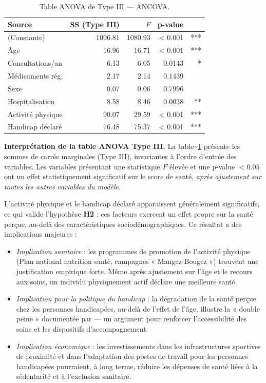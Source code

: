 \documentclass[11pt,a4paper]{memoirerecherche}
\providecommand{\tightlist}{%
  \setlength{\itemsep}{0pt}\setlength{\parskip}{0pt}}
\begin{document}
\begin{table}[!h]
\centering
\caption{\label{tab:tab-ancova}Table ANOVA de Type III --- ANCOVA.}
\centering
\fontsize{9}{11}\selectfont
\begin{tabular}[t]{lrrrr}
\toprule
Source & SS (Type III) & $F$ & p-value & \\
\midrule
(Constante) & 1096.81 & 1080.93 & < 0.001 & ***\\
Âge & 16.96 & 16.71 & < 0.001 & ***\\
Consultations/an & 6.13 & 6.05 & 0.0143 & *\\
Médicaments rég. & 2.17 & 2.14 & 0.1439 & \\
Sexe & 0.07 & 0.06 & 0.7996 & \\
\addlinespace
Hospitalisation & 8.58 & 8.46 & 0.0038 & **\\
Activité physique & 90.07 & 29.59 & < 0.001 & ***\\
Handicap déclaré & 76.48 & 75.37 & < 0.001 & ***\\
\bottomrule
\end{tabular}
\end{table}

\textbf{Interprétation de la table ANOVA Type III.} La table\textasciitilde\ref{tab:tab-ancova} présente les sommes de carrés marginales (Type III), invariantes à l'ordre d'entrée des variables. Les variables présentant une statistique \(F\) élevée et une p-value \(< 0.05\) ont un effet statistiquement significatif sur le score de santé, \emph{après ajustement sur toutes les autres variables du modèle}.

L'activité physique et le handicap déclaré apparaissent généralement significatifs, ce qui valide l'hypothèse \textbf{H2} : ces facteurs exercent un effet propre sur la santé perçue, au-delà des caractéristiques sociodémographiques. Ce résultat a des implications majeures :

\begin{itemize}
\tightlist
\item
  \emph{Implication sanitaire} : les programmes de promotion de l'activité physique (Plan national nutrition santé, campagnes « Mangez-Bougez ») trouvent une justification empirique forte. Même après ajustement sur l'âge et le recours aux soins, un individu physiquement actif déclare une meilleure santé.
\item
  \emph{Implication pour la politique du handicap} : la dégradation de la santé perçue chez les personnes handicapées, au-delà de l'effet de l'âge, illustre la « double peine » documentée par \textcite{cambois2008} --- un argument pour renforcer l'accessibilité des soins et les dispositifs d'accompagnement.
\item
  \emph{Implication économique} : les investissements dans les infrastructures sportives de proximité et dans l'adaptation des postes de travail pour les personnes handicapées pourraient, à long terme, réduire les dépenses de santé liées à la sédentarité et à l'exclusion sanitaire.
\end{itemize}
\end{document}
